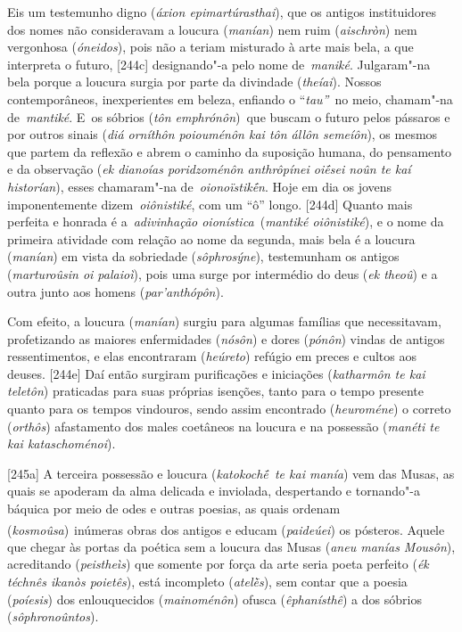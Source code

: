 Eis um testemunho digno (\emph{áxion epimartúrasthai}), que os antigos
instituidores dos nomes não consideravam a loucura (\emph{manían}) nem
ruim (\emph{aischròn}) nem vergonhosa (\emph{óneidos}), pois não a
teriam misturado à arte mais bela, a que interpreta o futuro, [244c]
designando"-a pelo nome de~\emph{maniké}. Julgaram"-na bela porque a
loucura surgia por parte da divindade (\emph{theíai}). Nossos
contemporâneos, inexperientes em beleza, enfiando o ``\emph{tau''}~no
meio, chamam"-na de~\emph{mantiké}. E~os sóbrios (\emph{tôn
emphrónôn})~que buscam o futuro pelos pássaros e por outros sinais
(\emph{diá orníthôn poiouménôn kai tôn állôn semeíôn}), os mesmos que
partem da reflexão e abrem o caminho da suposição humana, do pensamento
e da observação (\emph{ek dianoías poridzoménôn anthrôpínei oiḗsei noûn
te kaí historían}), esses chamaram"-na de~\emph{oionoïstikḗn}. Hoje em
dia os jovens imponentemente dizem~\emph{oiônistiké}, com um ``ô''
longo. [244d] Quanto mais perfeita e honrada é a~\emph{adivinhação
oionística~}(\emph{mantiké oiônistiké}), e o nome da primeira atividade
com relação ao nome da segunda, mais bela é a loucura (\emph{manían}) em
vista da sobriedade (\emph{sôphrosýne}), testemunham os antigos
(\emph{marturoûsin oi palaioì}), pois uma surge por intermédio do deus
(\emph{ek theoû}) e a outra junto aos homens (\emph{par'anthópôn}).

Com efeito, a loucura (\emph{manían}) surgiu para algumas famílias que
necessitavam, profetizando as maiores enfermidades (\emph{nósôn}) e
dores (\emph{pónôn}) vindas de antigos ressentimentos, e elas
encontraram (\emph{heúreto}) refúgio em preces e cultos aos deuses.
[244e] Daí então surgiram purificações e iniciações (\emph{katharmôn
te kai teletôn}) praticadas para suas próprias isenções, tanto para o
tempo presente quanto para os tempos vindouros, sendo assim encontrado
(\emph{heuroméne}) o correto (\emph{orthôs}) afastamento dos males
coetâneos na loucura e na possessão (\emph{manéti te kai
kataschoménoi}).

[245a] A terceira possessão e loucura (\emph{katokochḗ~te kai
manía}) vem das Musas, as quais se apoderam da alma delicada e
inviolada, despertando e tornando"-a báquica por meio de odes e outras
poesias, as quais ordenam (\emph{kosmoûsa})\textsuperscript{~}inúmeras
obras dos antigos e educam (\emph{paideúei}) os pósteros. Aquele que
chegar às portas da poética sem a loucura das Musas (\emph{aneu manías
Mousôn}), acreditando (\emph{peistheìs}) que somente por força da arte
seria poeta perfeito (\emph{ék téchnês ikanòs poietês}), está incompleto
(\emph{atelḕs}), sem contar que a poesia (\emph{poíesis}) dos
enlouquecidos (\emph{mainoménôn}) ofusca (\emph{êphanísthê}) a dos
sóbrios (\emph{sôphronoûntos}).


